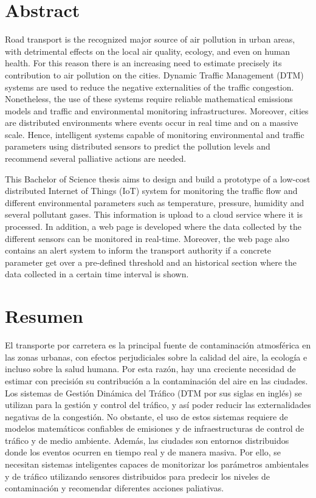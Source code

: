 
\chapter{Abstract}

Road transport is the recognized major source of air pollution in urban areas, with detrimental effects on the local air quality, ecology, and even on human health. For this reason there is an increasing need to estimate precisely its contribution to air pollution on the cities. Dynamic Traffic Management (DTM) systems are used to reduce the negative externalities of the traffic congestion. Nonetheless, the use of these systems require reliable mathematical emissions models and traffic and environmental monitoring infrastructures. Moreover, cities are distributed environments where events occur in real time and on a massive scale. Hence, intelligent systems capable of monitoring environmental and traffic parameters using distributed sensors to predict the pollution levels and recommend several palliative actions are needed.

This Bachelor of Science thesis aims to design and build a prototype of a low-cost distributed Internet of Things (IoT) system for monitoring the traffic flow and different environmental parameters such as temperature, pressure, humidity and several pollutant gases. This information is upload to a cloud service where it is processed. In addition, a web page is developed where the data collected by the different sensors can be monitored in real-time. Moreover, the web page also contains an alert system to inform the transport authority if a concrete parameter get over a pre-defined threshold and an historical section where the data collected in a certain time interval is shown.


\chapter{Resumen}

El transporte por carretera es la principal fuente de contaminación atmosférica en las zonas urbanas, con efectos perjudiciales sobre la calidad del aire, la ecología e incluso sobre la salud humana. Por esta razón, hay una creciente necesidad de estimar con precisión su contribución a la contaminación del aire en las ciudades. Los sistemas de Gestión Dinámica del Tráfico (DTM por sus siglas en inglés) se utilizan para la gestión y control del tráfico, y así poder reducir las externalidades negativas de la congestión. No obstante, el uso de estos sistemas requiere de modelos matemáticos confiables de emisiones y de infraestructuras de control de tráfico y de medio ambiente. Además, las ciudades son entornos distribuidos donde los eventos ocurren en tiempo real y de manera masiva. Por ello, se necesitan sistemas inteligentes capaces de monitorizar los parámetros ambientales y de tráfico utilizando sensores distribuidos para predecir los niveles de contaminación y recomendar diferentes acciones paliativas.

